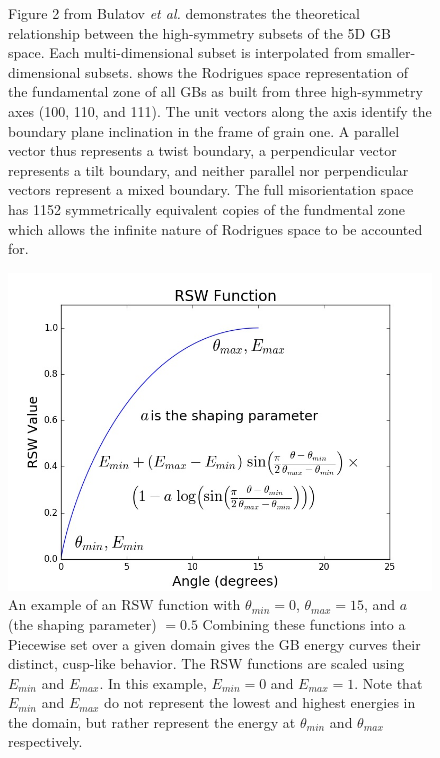 \documentclass[twoside,senior]{BYUPhys}
\begin{document}
\begin{figure}[ht!]
 \caption[Theoretical relationship between high-symmetry subsets and fundamental zone.]{\label{fig:bulatovFig2}Figure 2 from Bulatov \emph{et al.}\cite{bulatov2014} \protect{} demonstrates the theoretical relationship between the high-symmetry subsets of the 5D GB space.  Each multi-dimensional subset is interpolated from smaller-dimensional subsets. \protect{} shows the Rodrigues space representation of the fundamental zone of all GBs as built from three high-symmetry axes (\textlangle{}100\textrangle{}, \textlangle{}110\textrangle{}, and \textlangle{}111\textrangle{}).  The unit vectors along the axis identify the boundary plane inclination in the frame of grain one.  A parallel vector thus represents a twist boundary, a perpendicular vector represents a tilt boundary, and neither parallel nor perpendicular vectors represent a mixed boundary.  The full misorientation space has 1152 symmetrically equivalent copies of the fundmental zone\cite{bulatov2014,randle2000} which allows the infinite nature of Rodrigues space to be accounted for.}
\end{figure}

\begin{figure}[ht!]
 \centering
 \includegraphics[scale=0.5]{Images/rsw}
 \caption[General form of an RSW function.]{\label{fig:RSW}An example of an RSW function with $\theta_{min} = 0$\textdegree{}, $\theta_{max} = 15$\textdegree{}, and $a$ (the shaping parameter) $= 0.5$  Combining these functions into a Piecewise set over a given domain gives the GB energy curves their distinct, cusp-like behavior.  The RSW functions are scaled using $E_{min}$ and $E_{max}$.  In this example, $E_{min} = 0$ and $E_{max} = 1$. Note that $E_{min}$ and $E_{max}$ do not represent the lowest and highest energies in the domain, but rather represent the energy at $\theta_{min}$ and $\theta_{max}$ respectively.}
\end{figure}
\end{document}
